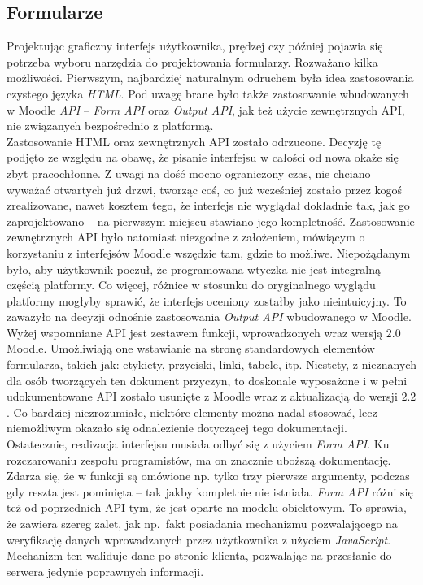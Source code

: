 \subsection{Formularze}
\label{Chapter625}

Projektując graficzny interfejs użytkownika, prędzej czy później pojawia się potrzeba wyboru narzędzia do projektowania formularzy. Rozważano kilka możliwości. Pierwszym, najbardziej naturalnym odruchem była idea zastosowania czystego języka \textit{HTML}. Pod uwagę brane było także zastosowanie wbudowanych w Moodle \textit{API} -- \textit{Form API} oraz \textit{Output API}, jak też użycie zewnętrznych API, nie związanych bezpośrednio z platformą. \\

Zastosowanie HTML oraz zewnętrznych API zostało odrzucone. Decyzję tę podjęto ze względu na obawę, że pisanie interfejsu w całości od nowa okaże się zbyt pracochłonne. Z uwagi na dość mocno ograniczony czas, nie chciano wyważać otwartych już drzwi, tworząc coś, co już wcześniej zostało przez kogoś zrealizowane, nawet kosztem tego, że interfejs nie wyglądał dokładnie tak, jak go zaprojektowano -- na pierwszym miejscu stawiano jego kompletność. Zastosowanie zewnętrznych API było natomiast niezgodne z założeniem, mówiącym o korzystaniu z interfejsów Moodle wszędzie tam, gdzie to możliwe. Niepożądanym było, aby użytkownik poczuł, że programowana wtyczka nie jest integralną częścią platformy. Co więcej, różnice w stosunku do oryginalnego wyglądu platformy mogłyby sprawić, że interfejs oceniony zostałby jako nieintuicyjny. To zaważyło na decyzji odnośnie zastosowania \textit{Output API} wbudowanego w Moodle. \\

Wyżej wspomniane API jest zestawem funkcji, wprowadzonych wraz wersją $2.0$ Moodle. Umożliwiają one wstawianie na stronę standardowych elementów formularza, takich jak: etykiety, przyciski, linki, tabele, itp. Niestety, z nieznanych dla osób tworzących ten dokument przyczyn, to doskonale wyposażone i w pełni udokumentowane API zostało usunięte z Moodle wraz z aktualizacją do wersji $2.2$. Co bardziej niezrozumiałe, niektóre elementy można nadal stosować, lecz niemożliwym okazało się odnalezienie dotyczącej tego dokumentacji. \\

Ostatecznie, realizacja interfejsu musiała odbyć się z użyciem \textit{Form API}. Ku rozczarowaniu zespołu programistów, ma on znacznie uboższą dokumentację. Zdarza się, że w funkcji są omówione np. tylko trzy pierwsze argumenty, podczas gdy reszta jest pominięta -- tak jakby kompletnie nie istniała. \textit{Form API} różni się też od poprzednich API tym, że jest oparte na modelu obiektowym. To sprawia, że zawiera szereg zalet, jak np.~fakt posiadania mechanizmu pozwalającego na weryfikację danych wprowadzanych przez użytkownika z użyciem \textit{JavaScript}. Mechanizm ten waliduje dane po stronie klienta, pozwalając na przesłanie do serwera jedynie poprawnych informacji. \\

